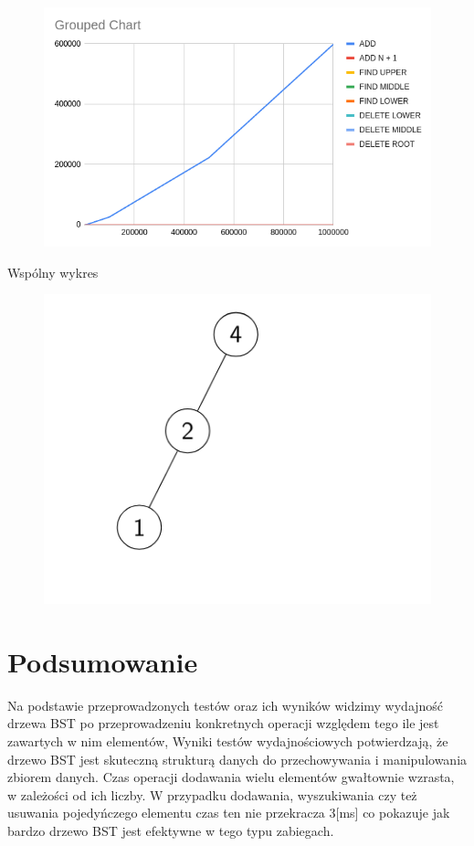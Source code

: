 \documentclass{article}
\begin{document}
\begin{figure}[H]
    \centering
    \includegraphics[width=\textwidth]{"../assets/4_9.png"}    
    \label{fig:4_9}

\end{figure}

Wspólny wykres
\begin{figure}[H]
    \centering
    \includegraphics[width=\textwidth]{"../assets/3_3.png"}
    \label{fig:3_3}
\end{figure}


\section*{Podsumowanie}
Na podstawie przeprowadzonych testów oraz ich wyników widzimy wydajność drzewa BST po przeprowadzeniu konkretnych operacji względem tego ile jest zawartych w nim elementów, Wyniki testów wydajnościowych potwierdzają, że drzewo BST jest skuteczną strukturą danych do przechowywania i manipulowania zbiorem danych. Czas operacji dodawania wielu elementów gwałtownie wzrasta, w zależości od ich liczby. W przypadku dodawania, wyszukiwania czy też usuwania pojedyńczego elementu czas ten nie przekracza 3[ms] co pokazuje jak bardzo drzewo BST jest efektywne w tego typu zabiegach. 
\end{document}
